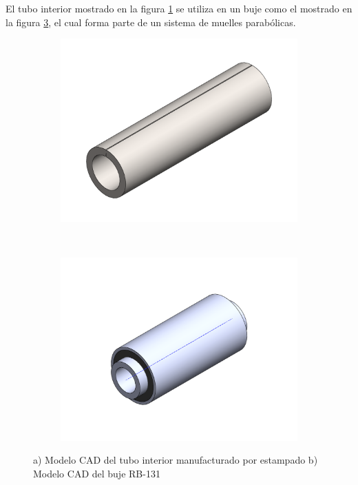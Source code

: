 El tubo interior mostrado en la figura \ref{fig:ti_rb131} se utiliza en un buje como 
el mostrado en la figura \ref{fig:buje_rb131}, el cual forma parte de un sistema de muelles 
parabólicas.

\begin{figure}[H]
\centering
\begin{subfigure}[t]{0.35\textwidth}
\centering
\includegraphics[width=\textwidth]{src/ch3/ti_rb131.pdf}
\caption{}
\label{fig:ti_rb131}
\end{subfigure}
~  
\begin{subfigure}[t]{0.35\textwidth}
\centering
\includegraphics[width=\textwidth]{src/ch3/buje_rb131.pdf}
\caption{}
\label{fig:buje_rb131}
\end{subfigure}
\caption{a) Modelo CAD del tubo interior manufacturado por estampado b) Modelo CAD del buje RB-131}
\end{figure}

